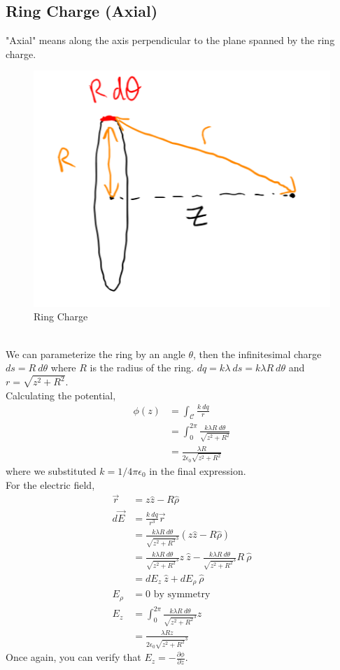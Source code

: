 \documentclass{article}
\begin{document}
\subsection{Ring Charge (Axial)}
"Axial" means along the axis perpendicular to the plane spanned by the ring charge.
\begin{figure}[h]
    \centering
    \includegraphics[width=0.8\linewidth]{images/ringcharge.png}
    \caption{Ring Charge}
    \label{fig:ringcharge}
\end{figure}\\[10pt]
We can parameterize the ring by an angle $\theta$, then the infinitesimal charge $ds = R\ d\theta$ where $R$ is the radius of the ring. $dq = k \lambda\ ds = k \lambda R\ d\theta$ and $r = \sqrt{z^2 + R^2}$. \\[10pt]
Calculating the potential,
\begin{align}
\phi(z) &= \int_\mathcal{C} \frac{k\ dq}{r} \\ 
&=\int_0^{2 \pi} \frac{k \lambda R\ d \theta}{\sqrt{z^2+R^2}} \\
&= \frac{ \lambda R}{2 \epsilon_0 \sqrt{z^2+R^2}} 
\end{align}
where we substituted $k=1/4\pi\epsilon_0$ in the final expression. \\[10pt]
For the electric field,
\begin{align} 
\vec{r}&=z \hat{z}-R \hat{\rho} \\
d \vec{E}&= \frac{k\ dq}{r^3} \vec{r}\\
&=\frac{k \lambda R\ d \theta}{\sqrt{z^2+R^2}^3}(z \hat{z}-R \hat{\rho}) \\
&= \frac{k \lambda R\ d \theta}{\sqrt{z^2+R^2}^3}z\ \hat{z}- \frac{k \lambda R\ d \theta}{\sqrt{z^2+R^2}^3} R\ \hat{\rho} \\
&= dE_z\ \hat{z} + dE_\rho\ \hat{\rho} \\
E_\rho &= 0 \text{ by symmetry} \\
E_z&=\int_0^{2 \pi} \frac{k \lambda R\ d \theta}{{\sqrt{z^2+R^2}}^3} z \\
&= \frac{ \lambda R z}{{2\epsilon_0 \sqrt{z^2+R^2}}^3} 
\end{align}
Once again, you can verify that $E_z = -\frac{\partial \phi}{\partial z}$.
\end{document}
